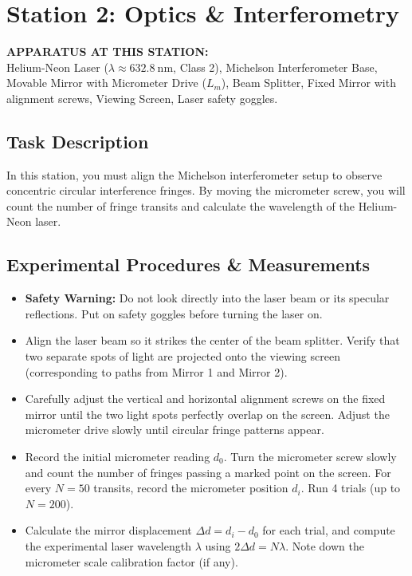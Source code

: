 \section{Station 2: Optics \& Interferometry}
\label{sec:station2}

\noindent
\begin{tcolorbox}[
    colback=primary!5,
    colframe=primary!30,
    boxrule=0.8pt,
    arc=3pt,
    left=10pt, right=10pt, top=8pt, bottom=8pt
]
\sffamily\small
\textbf{APPARATUS AT THIS STATION:} \\
Helium-Neon Laser ($\lambda \approx \SI{632.8}{\nano\meter}$, Class 2), Michelson Interferometer Base, Movable Mirror with Micrometer Drive ($L_m$), Beam Splitter, Fixed Mirror with alignment screws, Viewing Screen, Laser safety goggles.
\end{tcolorbox}

\subsection{Task Description}
In this station, you must align the Michelson interferometer setup to observe concentric circular interference fringes. By moving the micrometer screw, you will count the number of fringe transits and calculate the wavelength of the Helium-Neon laser.

\subsection{Experimental Procedures \& Measurements}

\begin{itemize}[label=\checkbox, leftmargin=*, itemsep=0.8em]
    \item \textbf{Safety Warning:} Do not look directly into the laser beam or its specular reflections. Put on safety goggles before turning the laser on. 
    
    \item Align the laser beam so it strikes the center of the beam splitter. Verify that two separate spots of light are projected onto the viewing screen (corresponding to paths from Mirror 1 and Mirror 2). 
    
    \item Carefully adjust the vertical and horizontal alignment screws on the fixed mirror until the two light spots perfectly overlap on the screen. Adjust the micrometer drive slowly until circular fringe patterns appear. 
    
    \item Record the initial micrometer reading $d_0$. Turn the micrometer screw slowly and count the number of fringes passing a marked point on the screen. For every $N = 50$ transits, record the micrometer position $d_i$. Run 4 trials (up to $N = 200$). 
    
    \item Calculate the mirror displacement $\Delta d = d_i - d_0$ for each trial, and compute the experimental laser wavelength $\lambda$ using $2\Delta d = N \lambda$. Note down the micrometer scale calibration factor (if any). 
\end{itemize}

